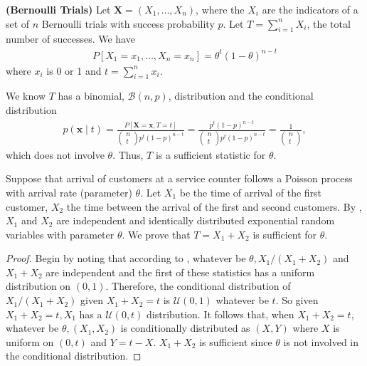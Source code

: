 \documentclass{article}
\newcommand{\bfs}[1]{\textbf{({#1}) }}
\begin{document}
\begin{exma}\bfs{Bernoulli Trials}\label{ex:ber_trial1}
Let $\mathbf{X}=\left(X_{1}, \ldots, X_{n}\right)$, where the $X_{i}$ are the indicators of a set of $n$ Bernoulli trials with success probability $p .$ Let $T=\sum_{i=1}^{n} X_{i}$, the total number of successes.  We have
\begin{align*}
P\left[X_{1}=x_{1}, \ldots, X_{n}=x_{n}\right]=\theta^{t}(1-\theta)^{n-t}
\end{align*}
where $x_{i}$ is 0 or 1 and $t=\sum_{i=1}^{n} x_{i}$. 

We know $T$ has a binomial, $\mathcal{B}(n, p)$, distribution and the conditional distribution
\begin{align*}
p(\mathbf{x} \mid t)=\frac{P[\mathbf{X}=\mathbf{x}, T=t]}{\left(\begin{array}{c}
n \\
t
\end{array}\right) p^{t}(1-p)^{n-t}}=\frac{p^{t}(1-p)^{n-t}}{\left(\begin{array}{c}
n \\
t
\end{array}\right) p^{t}(1-p)^{n-t}}=\frac{1}{\left(\begin{array}{c}
n \\
t
\end{array}\right)},
\end{align*}
which does not involve $\theta$. Thus, $T$ is a sufficient statistic for $\theta$.
\end{exma}
\begin{exma}
Suppose that arrival of customers at a service counter follows a Poisson process with arrival rate (parameter) $\theta$. Let $X_{1}$ be the time of arrival of the first customer, $X_{2}$ the time between the arrival of the first and second customers. By \cite[A.16.4]{Rice}, $X_{1}$ and $X_{2}$ are independent and identically distributed exponential random variables with parameter $\theta$. We prove that $T=X_{1}+X_{2}$ is sufficient for $\theta$. 
\begin{proof}
Begin by noting that according to \cite[Theorem B.2.3]{Rice} , whatever be $\theta, X_{1} /\left(X_{1}+X_{2}\right)$ and $X_{1}+X_{2}$ are independent and the first of these statistics has a uniform distribution on $(0,1)$. Therefore, the conditional distribution of $X_{1} /\left(X_{1}+X_{2}\right)$ given $X_{1}+X_{2}=t$ is $\mathcal{U}(0,1)$ whatever be $t$. So given $X_{1}+X_{2}=t, X_{1}$ has a $\mathcal{U}(0, t)$ distribution. It follows that, when $X_{1}+X_{2}=t$, whatever be $\theta,\left(X_{1}, X_{2}\right)$ is conditionally distributed as $(X, Y)$ where $X$ is uniform on $(0, t)$ and $Y=t-X$.  $X_{1}+X_{2}$ is sufficient since  $\theta$ is not involved in the conditional distribution.
\end{proof}
\end{exma}
\end{document}
